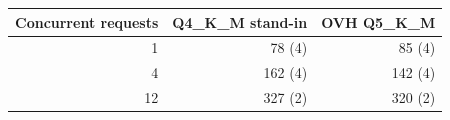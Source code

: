 \begin{tabular}{@{}rrr@{}}
\toprule
Concurrent requests & Q4\_K\_M stand-in & OVH Q5\_K\_M \\
\midrule
1 & 78 (4) & 85 (4) \\
4 & 162 (4) & 142 (4) \\
12 & 327 (2) & 320 (2) \\
\bottomrule
\end{tabular}
